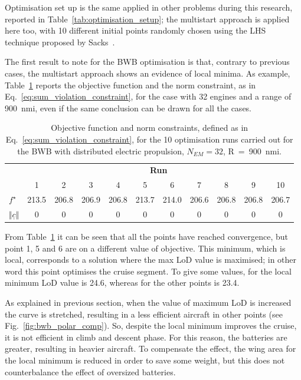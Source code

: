 Optimisation set up is the same applied in other problems during this research, reported in Table~\ref{tab:optimisation_setup}; the multistart approach is applied here too, with 10 different initial points randomly chosen using the LHS technique proposed by Sacks~\cite{bib:sacks}. 

The first result to note for the BWB optimisation is that, contrary to previous cases, the multistart approach shows an evidence of local minima. 
As example, Table~\ref{tab:bwb_dep_optim_multipoint_result} reports the objective function and the norm constraint, as in Eq.~\eqref{eq:sum_violation_constraint}, for the case with 32 engines and a range of 900~nmi, even if the same conclusion can be drawn for all the cases.
\begin{table}[!h]
	\centering
	\begin{tabular}{l c c c c c c c c c c}
		\cline{2-11}
		& \multicolumn{10}{c}{\textbf{Run}} \\
		\cline{2-11}
		& 1 & 2 & 3 & 4 & 5 & 6 & 7 & 8 & 9 & 10 \\
		\hline
		$f^\star$ & 213.5 & 206.8 & 206.9 & 206.8 & 213.7 & 214.0 & 206.6 & 206.8 & 206.8 & 206.7 \\
		$\Vert \underline c \Vert$ & 0 & 0 & 0 & 0 & 0 & 0 & 0 & 0 & 0 & 0\\
		\hline
	\end{tabular}
	\caption{Objective function and norm constraints, defined as in Eq.~\eqref{eq:sum_violation_constraint}, for the 10 optimisation runs carried out for the BWB with distributed electric propulsion, $N_{EM}=32$, R~=~900~nmi.}
	\label{tab:bwb_dep_optim_multipoint_result}
\end{table}
From Table~\ref{tab:bwb_dep_optim_multipoint_result} it can be seen that all the points have reached convergence, but point 1, 5 and 6 are on a different value of objective. 
This minimum, which is local, corresponds to a solution where the max LoD value is maximised; in other word this point optimises the cruise segment. 
To give some values, for the local minimum LoD value is 24.6, whereas for the other points is 23.4. 

As explained in previous section, when the value of maximum LoD is increased the curve is stretched, resulting in a less efficient aircraft in other points (see Fig.~\ref{fig:bwb_polar_comp}). 
So, despite the local minimum improves the cruise, it is not efficient in climb and descent phase. 
For this reason, the batteries are greater, resulting in heavier aircraft. 
To compensate the effect, the wing area for the local minimum is reduced in order to save some weight, but this does not counterbalance the effect of oversized batteries. 

